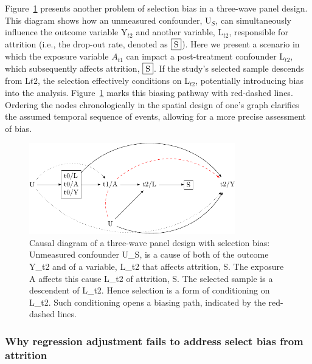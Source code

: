 \documentclass[
  singlecolumn]{article}
\begin{document}
Figure~\ref{fig-dag-8-2} presents another problem of selection bias in a
three-wave panel design. This diagram shows how an unmeasured
confounder, U\(_S\), can simultaneously influence the outcome variable
Y\(_{t2}\) and another variable, L\(_{t2}\), responsible for attrition
(i.e., the drop-out rate, denoted as \(\framebox{S}\)). Here we present
a scenario in which the exposure variable \(A_{t1}\) can impact a
post-treatment confounder L\(_{t2}\), which subsequently affects
attrition, \(\framebox{S}\). If the study's selected sample descends
from L\({t2}\), the selection effectively conditions on L\(_{t2}\),
potentially introducing bias into the analysis. Figure~\ref{fig-dag-8-2}
marks this biasing pathway with red-dashed lines. Ordering the nodes
chronologically in the spatial design of one's graph clarifies the
assumed temporal sequence of events, allowing for a more precise
assessment of bias.

\begin{figure}

{\centering \includegraphics[width=0.8\textwidth,height=\textheight]{causal-dags_files/figure-pdf/fig-dag-8-2-1.pdf}

}

\caption{\label{fig-dag-8-2}Causal diagram of a three-wave panel design
with selection bias: Unmeasured confounder U\_S, is a cause of both of
the outcome Y\_t2 and of a variable, L\_t2 that affects attrition, S.
The exposure A affects this cause L\_t2 of attrition, S. The selected
sample is a descendent of L\_t2. Hence selection is a form of
conditioning on L\_t2. Such conditioning opens a biasing path, indicated
by the red-dashed lines.}

\end{figure}

\hypertarget{why-regression-adjustment-fails-to-address-select-bias-from-attrition}{%
\subsubsection{Why regression adjustment fails to address select bias
from
attrition}\label{why-regression-adjustment-fails-to-address-select-bias-from-attrition}}
\end{document}
